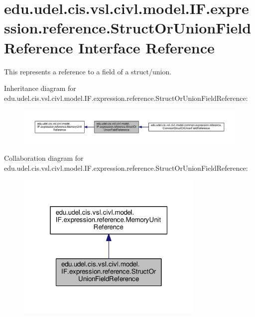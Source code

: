 \hypertarget{interfaceedu_1_1udel_1_1cis_1_1vsl_1_1civl_1_1model_1_1IF_1_1expression_1_1reference_1_1StructOrUnionFieldReference}{}\section{edu.\+udel.\+cis.\+vsl.\+civl.\+model.\+I\+F.\+expression.\+reference.\+Struct\+Or\+Union\+Field\+Reference Interface Reference}
\label{interfaceedu_1_1udel_1_1cis_1_1vsl_1_1civl_1_1model_1_1IF_1_1expression_1_1reference_1_1StructOrUnionFieldReference}


This represents a reference to a field of a struct/union.  




Inheritance diagram for edu.\+udel.\+cis.\+vsl.\+civl.\+model.\+I\+F.\+expression.\+reference.\+Struct\+Or\+Union\+Field\+Reference\+:
\nopagebreak
\begin{figure}[H]
\begin{center}
\leavevmode
\includegraphics[width=350pt]{interfaceedu_1_1udel_1_1cis_1_1vsl_1_1civl_1_1model_1_1IF_1_1expression_1_1reference_1_1StructOre911b7ce14aff2012709e566febb5c4b}
\end{center}
\end{figure}


Collaboration diagram for edu.\+udel.\+cis.\+vsl.\+civl.\+model.\+I\+F.\+expression.\+reference.\+Struct\+Or\+Union\+Field\+Reference\+:
\nopagebreak
\begin{figure}[H]
\begin{center}
\leavevmode
\includegraphics[width=256pt]{interfaceedu_1_1udel_1_1cis_1_1vsl_1_1civl_1_1model_1_1IF_1_1expression_1_1reference_1_1StructOr44739acfb800fa0aa5e007dd1dc612d4}
\end{center}
\end{figure}
